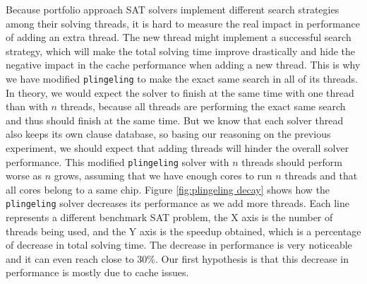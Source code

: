 \documentclass[12pt]{diicc}
\begin{document}
Because portfolio approach SAT solvers implement different search strategies among their solving threads, it is hard to measure the real impact in performance of adding an extra thread. The new thread might implement a successful search strategy, which will make the total solving time improve drastically and hide the negative impact in the cache performance when adding a new thread. This is why we have modified \texttt{plingeling} to make the exact same search in all of its threads. In theory, we would expect the solver to finish at the same time with one thread than with $n$ threads, because all threads are performing the exact same search and thus should finish at the same time. But we know that each solver thread also keeps its own clause database, so basing our reasoning on the previous experiment, we should expect that adding threads will hinder the overall solver performance. This modified \texttt{plingeling} solver with $n$ threads should perform worse as $n$ grows, assuming that we have enough cores to run $n$ threads and that all cores belong to a same chip. Figure \ref{fig:plingeling decay} shows how the \texttt{plingeling} solver decreases its performance as we add more threads. Each line represents a different benchmark SAT problem, the X axis is the number of threads being used, and the Y axis is the speedup obtained, which is a percentage of decrease in total solving time. The decrease in performance is very noticeable and it can even reach close to 30\%. Our first hypothesis is that this decrease in performance is mostly due to cache issues.
\end{document}
